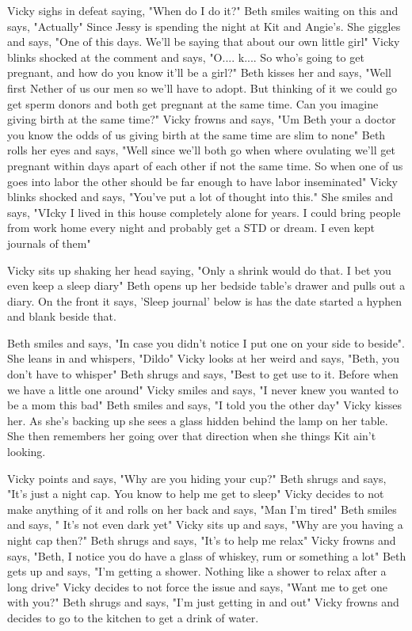 \documentclass{article}[12px]
\begin{document}
    Vicky sighs in defeat saying, "When do I do it?" Beth smiles waiting on this and says, "Actually" Since Jessy is spending the night at Kit and Angie's. She giggles and says, "One of this days. We'll be saying that about our own little girl" Vicky blinks shocked at the comment and says, "O.... k.... So who's going to get pregnant, and how do you know it'll be a girl?" Beth kisses her and says, "Well first Nether of us our men so we'll have to adopt. But thinking of it we could go get sperm donors and both get pregnant at the same time. Can you imagine giving birth at the same time?" Vicky frowns and says, "Um Beth your a doctor you know the odds of us giving birth at the same time are slim to none" Beth rolls her eyes and says, "Well since we'll both go when where ovulating we'll get pregnant within days apart of each other if not the same time. So when one of us goes into labor the other should be far enough to have labor inseminated" Vicky blinks shocked and says, "You've put a lot of thought into this." She smiles and says, "VIcky I lived in this house completely alone for years. I could bring people from work home every night and probably get a STD or dream. I even kept journals of them" 
    
    Vicky sits up shaking her head saying, "Only a shrink would do that. I bet you even keep a sleep diary" Beth opens up her bedside table's drawer and pulls out a diary. On the front it says, 'Sleep journal' below is has the date started a hyphen and blank beside that.

    Beth smiles and says, "In case you didn't notice I put one on your side to beside". She leans in and whispers, "Dildo" Vicky looks at her weird and says, "Beth, you don't have to whisper" Beth shrugs and says, "Best to get use to it. Before when we have a little one around" Vicky smiles and says, "I never knew you wanted to be a mom this bad" Beth smiles and says, "I told you the other day" Vicky kisses her. As she's backing up she sees a glass hidden behind the lamp on her table. She then remembers her going over that direction when she things Kit ain't looking.

    Vicky points and says, "Why are you hiding your cup?" Beth shrugs and says, "It's just a night cap. You know to help me get to sleep" Vicky decides to not make anything of it and rolls on her back and says, "Man I'm tired" Beth smiles and says, " It's not even dark yet" Vicky sits up and says, "Why are  you having a night cap then?" Beth shrugs and says, "It's to help me relax" Vicky frowns and says, "Beth, I notice you do have a glass of whiskey, rum or something a lot" Beth gets up and says, "I'm getting a shower. Nothing like a shower to relax after a long drive" Vicky decides to not force the issue and says, "Want me to get one with you?" Beth shrugs and says, "I'm just getting in and out" Vicky frowns and decides to go to the kitchen to get a drink of water. 
\end{document}
